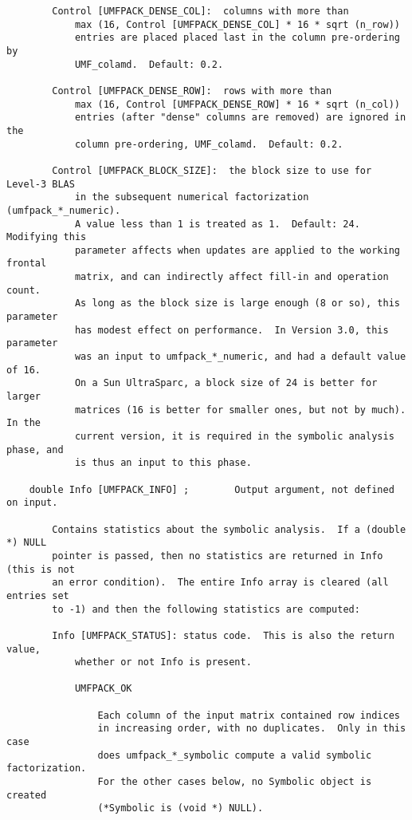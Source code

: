 {\begin{verbatim}
        Control [UMFPACK_DENSE_COL]:  columns with more than
            max (16, Control [UMFPACK_DENSE_COL] * 16 * sqrt (n_row))
            entries are placed placed last in the column pre-ordering by
            UMF_colamd.  Default: 0.2.

        Control [UMFPACK_DENSE_ROW]:  rows with more than
            max (16, Control [UMFPACK_DENSE_ROW] * 16 * sqrt (n_col))
            entries (after "dense" columns are removed) are ignored in the
            column pre-ordering, UMF_colamd.  Default: 0.2.

        Control [UMFPACK_BLOCK_SIZE]:  the block size to use for Level-3 BLAS
            in the subsequent numerical factorization (umfpack_*_numeric).
            A value less than 1 is treated as 1.  Default: 24.  Modifying this
            parameter affects when updates are applied to the working frontal
            matrix, and can indirectly affect fill-in and operation count.
            As long as the block size is large enough (8 or so), this parameter
            has modest effect on performance.  In Version 3.0, this parameter
            was an input to umfpack_*_numeric, and had a default value of 16.
            On a Sun UltraSparc, a block size of 24 is better for larger
            matrices (16 is better for smaller ones, but not by much).  In the
            current version, it is required in the symbolic analysis phase, and
            is thus an input to this phase.

    double Info [UMFPACK_INFO] ;        Output argument, not defined on input.

        Contains statistics about the symbolic analysis.  If a (double *) NULL
        pointer is passed, then no statistics are returned in Info (this is not
        an error condition).  The entire Info array is cleared (all entries set
        to -1) and then the following statistics are computed:

        Info [UMFPACK_STATUS]: status code.  This is also the return value,
            whether or not Info is present.

            UMFPACK_OK

                Each column of the input matrix contained row indices
                in increasing order, with no duplicates.  Only in this case
                does umfpack_*_symbolic compute a valid symbolic factorization.
                For the other cases below, no Symbolic object is created
                (*Symbolic is (void *) NULL).


\end{verbatim}}
